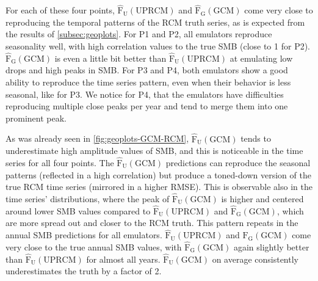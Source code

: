 \documentclass[a4paper,11pt,oneside]{report}
\begin{document}
For each of these four points, $\mathrm{\hat{F}_{U}(UPRCM)}$ and $\mathrm{\hat{F}_{G}(GCM)}$ come very close to reproducing the temporal patterns of the RCM truth series, as is expected from the results of \autoref{subsec:geoplots}. For P1 and P2, all emulators reproduce seasonality well, with high correlation values to the true SMB (close to 1 for P2). $\mathrm{\hat{F}_{G}(GCM)}$ is even a little bit better than $\mathrm{\hat{F}_{U}(UPRCM)}$ at emulating low drops and high peaks in SMB. For P3 and P4, both emulators show a good ability to reproduce the time series pattern, even when their behavior is less seasonal, like for P3. We notice for P4, that the emulators have difficulties reproducing multiple close peaks per year and tend to merge them into one prominent peak. 


As was already seen in \autoref{fig:geoplots-GCM-RCM}, $\mathrm{\hat{F}_{U}(GCM)}$ tends to underestimate high amplitude values of SMB, and this is noticeable in the time series for all four points. The $\mathrm{\hat{F}_{U}(GCM)}$ predictions can reproduce the seasonal patterns (reflected in a high correlation) but produce a toned-down version of the true RCM time series (mirrored in a higher RMSE). This is observable also in the time series' distributions, where the peak of $\mathrm{\hat{F}_{U}(GCM)}$ is higher and centered around lower SMB values compared to $\mathrm{\hat{F}_{U}(UPRCM)}$ and $\mathrm{\hat{F}_{G}(GCM)}$, which are more spread out and closer to the RCM truth. This pattern repeats in the annual SMB predictions for all emulators. $\mathrm{\hat{F}_{U}(UPRCM)}$ and $\mathrm{\hat{F}_{G}(GCM)}$ come very close to the true annual SMB values, with $\mathrm{\hat{F}_{G}(GCM)}$ again slightly better than $\mathrm{\hat{F}_{U}(UPRCM)}$ for almost all years. $\mathrm{\hat{F}_{U}(GCM)}$ on average consistently underestimates the truth by a factor of 2. 
\end{document}
